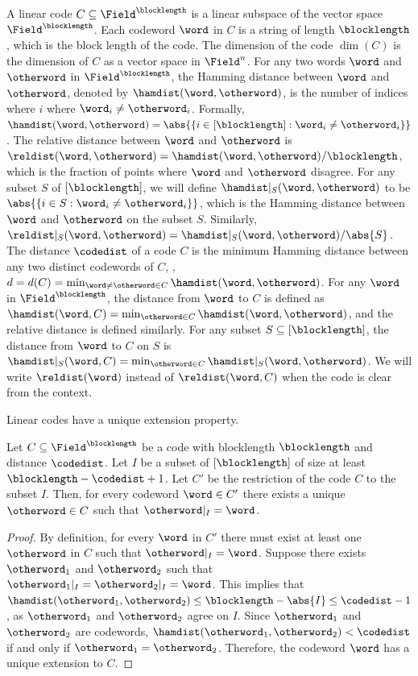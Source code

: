 \documentclass{toc}
\theoremstyle{plain}
\begin{document}
A linear code $C \subseteq \Field^{\blocklength}$ is a linear subspace of the vector space $\Field^{\blocklength}$. Each codeword $\word$ in $C$ is a string of length $\blocklength$, which is the block length of the code. The dimension of the code $\dim(C)$ is the dimension of $C$ as a vector space in $\Field^n$. For any two words $\word$ and $\otherword$ in $\Field^{\blocklength}$, the Hamming distance between $\word$ and $\otherword$, denoted by $\hamdist(\word,\otherword)$, is the number of indices where $i$ where $\word_i \ne \otherword_i$. Formally, $\hamdist(\word,\otherword) = \abs{\{i \in [\blocklength] : \word_i \ne \otherword_i\}}$. The relative distance between $\word$ and $\otherword$ is $\reldist(\word,\otherword) = \hamdist(\word,\otherword)/\blocklength$, which is the fraction of points where $\word$ and $\otherword$ disagree. For any subset $S$ of $[\blocklength]$, we will define $\hamdist \vert_S(\word,\otherword)$ to be $\abs{\{i \in S : \word_i \ne \otherword_i\}}$, which is the Hamming distance between $\word$ and $\otherword$ on the subset $S$. Similarly, $\reldist \vert_S(\word,\otherword) = \hamdist \vert_S (\word,\otherword) / \abs{S}$. The distance $\codedist$ of a code $C$ is the minimum Hamming distance between any two distinct codewords of $C$, \ie, $d = d(C) = \min_{\word \neq \otherword \in C} \hamdist(\word,\otherword)$. For any $\word$ in $\Field^{\blocklength}$, the distance from $\word$ to $C$ is defined as $\hamdist(\word,C) =\min_{\otherword \in C} \hamdist(\word,\otherword)$, and the relative distance is defined similarly. For any subset $S \subseteq [\blocklength]$, the distance from $\word$ to $C$ on $S$ is $\hamdist \vert_S (\word, C) = \min_{\otherword \in C} \hamdist \vert_S(\word,\otherword)$. We will write $\reldist(\word)$ instead of $\reldist(\word,C)$ when the code is clear from the context.

Linear codes have a unique extension property.
\begin{claim}\label{claim:ext}
Let $C \subseteq \Field^{\blocklength}$ be a code with blocklength $\blocklength$ and distance $\codedist$.
Let $I$ be a subset of $[\blocklength]$ of size at least $\blocklength - \codedist + 1$. Let $C'$ be the restriction of the code $C$ to the subset $I$.
Then, for every codeword $\word \in C'$ there exists a unique $\otherword \in C$ such that $\otherword \vert_I = \word$.
\end{claim}
\begin{proof}
By definition, for every $\word$ in $C'$ there must exist at least one $\otherword$ in $C$ such that $\otherword \vert_I = \word$. Suppose there exists $\otherword_1$ and $\otherword_2$ such that $\otherword_1 \vert_I = \otherword_2 \vert_I = \word$. This implies that $\hamdist(\otherword_1, \otherword_2) \leq \blocklength - \abs{I} \leq \codedist - 1$, as $\otherword_1$ and $\otherword_2$ agree on $I$. Since $\otherword_1$ and $\otherword_2$ are codewords, $\hamdist(\otherword_1,\otherword_2) < \codedist$ if and only if $\otherword_1 = \otherword_2$. Therefore, the codeword $\word$ has a unique extension to $C$.
\end{proof}
%
%
\end{document}
